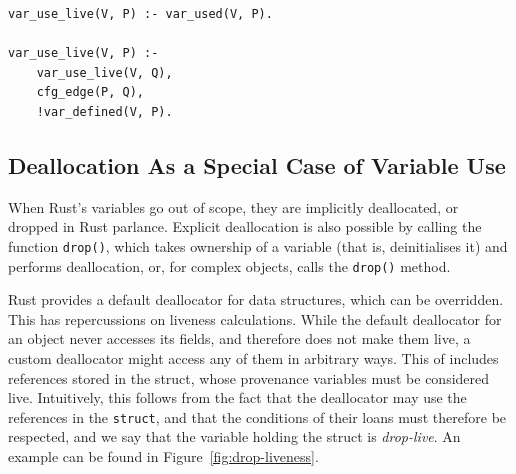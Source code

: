 \documentclass[11pt,a4paper,twoside,openany]{report}
\newenvironment{sourcecode}{\captionsetup{type=listing}}{}
\newcommand{\InRust}[1]{\texttt{#1}}
\begin{document}
\begin{sourcecode}
  \label{lst:var-live}
\begin{verbatim}
var_use_live(V, P) :- var_used(V, P).

var_use_live(V, P) :-
    var_use_live(V, Q),
    cfg_edge(P, Q),
    !var_defined(V, P).
\end{verbatim}
\end{sourcecode}

\subsection{Deallocation As a Special Case of Variable Use}
\label{sec:deall-as-spec}
When Rust's variables go out of scope, they are implicitly deallocated, or
dropped in Rust parlance. Explicit deallocation is also possible by calling the
function \InRust{drop()}, which takes ownership of a variable (that is,
deinitialises it) and performs deallocation, or, for complex objects, calls the
\InRust{drop()} method.

Rust provides a default deallocator for data structures, which can be
overridden. This has repercussions on liveness calculations. While the default
deallocator for an object never accesses its fields, and therefore does not make
them live, a custom deallocator might access any of them in arbitrary ways. This
of includes references stored in the struct, whose provenance variables must be
considered live. Intuitively, this follows from the fact that the deallocator
may use the references in the \InRust{struct}, and that the conditions of their
loans must therefore be respected, and we say that the variable holding the
struct is \textit{drop-live}. An example can be found in
Figure~\ref{fig:drop-liveness}.
\end{document}

